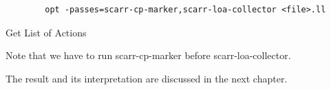 \begin{listing}
    \begin{verbatim}
        opt -passes=scarr-cp-marker,scarr-loa-collector <file>.ll
    \end{verbatim}
    \caption{Get List of Actions}    
    \label{listing:get-loa}
\end{listing}

Note that we have to run scarr-cp-marker before scarr-loa-collector.

The result and its interpretation are discussed in the next chapter.
